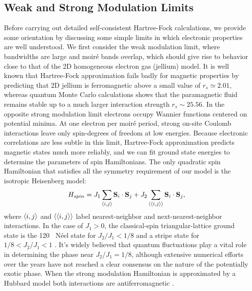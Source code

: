 \documentclass[%
 reprint,
 superscriptaddress,
 amsmath,amssymb,
 aps,
 prx,
 floatfix,
]{revtex4-2}
\newcommand{\<}{\langle}
\renewcommand{\>}{\rangle}
\renewcommand{\(}{\left(}
\renewcommand{\)}{\right)}
\renewcommand{\[}{\left[}
\renewcommand{\]}{\right]}
\DeclareMathOperator{\degree}{^{\circ}}
\begin{document}
\subsection{Weak and Strong Modulation Limits\label{sec:lim}}
Before carrying out detailed self-consistent Hartree-Fock calculations, we provide some orientation
by discussing some simple limits in which electronic properties are well understood.
We first consider the weak modulation limit, where bandwidths are large and 
moir\'e bands overlap, which should give rise to behavior 
close to that of the 2D homogeneous electron gas (jellium) model. 
It is well known that Hartree-Fock approximation fails badly for magnetic properties 
by predicting that 2D jellium is ferromagnetic
above a small value of $r_s \simeq 2.01$, whereas quantum Monte Carlo 
calculations \cite{Tanatar1989GroundSO, Attaccalite2002CorrelationEA} shows
that the paramagnetic fluid remains 
stable up to a much larger interaction strength $r_s \sim 25.56$.
In the opposite strong modulation limit electrons occupy Wannier functions 
centered on potential minima.  At one electron per moir\'e period, strong on-site Coulomb 
interactions leave only spin-degrees of freedom at low energies.
Because electronic correlations are less subtle in this limit, Hartree-Fock approximation predicts 
magnetic states much more reliably, and we can fit ground state energies to 
determine the parameters of spin Hamiltonians. 
The only quadratic spin Hamiltonian that satisfies all the symmetry requirement of our 
model is the isotropic Heisenberg
model:
\begin{align}
    H_{spin} = J_1\sum_{\braket{i,j}}\mathbf{S}_i\cdot\mathbf{S}_j+J_2\sum_{\braket{\braket{i,j}}}\mathbf{S}_i\cdot\mathbf{S}_j\label{eq:spin},
\end{align}
where $\braket{i,j}$ and $\braket{\braket{i,j}}$ label nearest-neighbor and next-nearest-neighbor interactions.
In the case of $J_1>0$, the classical-spin triangular-lattice ground state 
is the 120$\degree$ N\'eel state for $J_2/J_1<1/8$ and a stripe state 
for $1/8<J_2/J_1<1$ \cite{JolicoeurPhysRevB1990}. 
It's widely believed that quantum fluctuations play a vital role in determining the phase near $J_2/J_1=1/8$, 
although extensive numerical efforts over the years \cite{kaneko2014gapless, SLPhysRevB.92.041105, SLPhysRevB.92.140403, SLPhysRevB.93.144411, SLPhysRevB.96.075116, SLPhysRevLett.120.207203}
have not reached a clear consensus on the nature of the potentially exotic phase. 
When the strong modulation Hamiltonian 
is approximated by a Hubbard model both interactions are antiferromagnetic \cite{allanPhysRevB.37.9753}.
\end{document}
